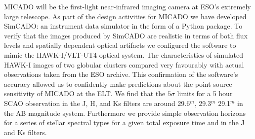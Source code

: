 \abstract
{}
{MICADO will be the first-light near-infrared imaging camera at ESO's extremely large telescope. As part of the design activities for MICADO we have developed SimCADO: an instrument data simulator in the form of a Python package.}
{To verify that the images produced by SimCADO are realistic in terms of both flux levels and spatially dependent optical artifacts we configured the software to mimic the HAWK-I/VLT-UT4 optical system. The characteristics of simulated HAWK-I images of two globular clusters compared very favourably with actual observations taken from the ESO archive. This confirmation of the software's accuracy allowed us to confidently make predictions about the point source sensitivity of MICADO at the ELT.}
{We find that the $5\sigma$ limits for a 5 hour SCAO observation in the J, H, and Ks filters are around 29.6$^m$, 29.3$^m$ 29.1$^m$ in the AB magnitude system. Furthermore we provide simple observation horizons for a series of stellar spectral types for a given total exposure time and in the J and Ks filters.}
{}


